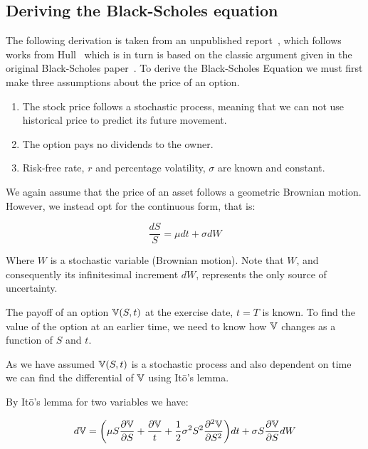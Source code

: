 \subsection{Deriving the Black-Scholes equation}

The following derivation is taken from an unpublished report~\cite{Yr2Project}, which follows works from Hull~\cite{hull2012options} which is in turn is based on the classic argument given in the original Black-Scholes paper~\cite{black1973pricing}. To derive the Black-Scholes Equation we must first make three assumptions about the price of an option.

\begin{enumerate}
    \item The stock price follows a stochastic process, meaning that we can not use historical price to predict its future movement.
    \item The option pays no dividends to the owner.
    \item Risk-free rate, \(r\) and percentage volatility, \(\sigma \) are known and constant.
\end{enumerate}

We again assume that the price of an asset follows a geometric Brownian motion. However, we instead opt for the continuous form, that is:

\begin{equation}\label{Brownian}
    \frac{dS}{S} = \mu dt + \sigma dW
\end{equation}

Where \(W\) is a stochastic variable (Brownian motion). Note that \(W \), and consequently its infinitesimal increment \(dW \), represents the only source of uncertainty.

The payoff of an option \(\mathbb{V}(S,t) \) at the exercise date, \(t = T\) is known. To find the value of the option at an earlier time, we need to know how \(\mathbb{V} \) changes as a function of \(S \) and \(t \).

As we have assumed \(\mathbb{V}(S,t) \) is a stochastic process and also dependent on time we can find the differential of \(\mathbb{V} \) using Itō's lemma. 

By Itō's lemma for two variables we have:

\begin{equation}\label{Ito}
    d\mathbb{V} = \bigg( \mu S \frac{\partial \mathbb{V}}{\partial S} + \frac{\partial \mathbb{V}}{t} + \frac{1}{2}\sigma^2 S^2 \frac{\partial^2 \mathbb{V}}{\partial S^2}\bigg)dt + \sigma S \frac{\partial \mathbb{V}}{\partial S}dW
\end{equation}

